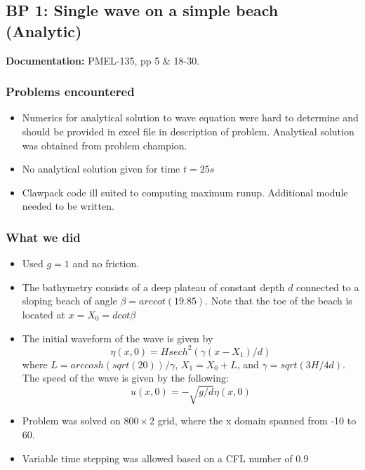 \newsection
\subsection{BP 1:
  Single wave on a simple beach (Analytic)}

{\bf Documentation:}  PMEL-135, pp 5 \&
18-30.\cite{SynolakisBernard:pmel135}

\subsubsection{Problems encountered}

\begin{itemize}
\item Numerics for analytical solution to wave equation were hard to determine and should be provided in excel file in description of problem. Analytical solution was obtained from problem champion.
\item No analytical solution given for time $t = 25s$
\item Clawpack code ill suited to computing maximum runup. Additional module needed to be written. 
\end{itemize}

\subsubsection{What we did}

\begin{itemize}
\item Used $g=1$ and no friction.
\item The bathymetry consists of a deep plateau of constant depth $d$ connected to a sloping beach of angle $\beta = arccot(19.85)$. Note that the toe of the beach is located at $x = X_0 = d cot \beta$
\item The initial waveform of the wave is given by 
\begin{equation}
\eta(x,0) = H sech^2(\gamma (x - X_1)/d)
\end{equation}
where $L = arccosh(sqrt(20))/\gamma$, $X_1 = X_0 + L$, and $\gamma = sqrt(3H/4d)$. The speed of the wave is given by the following: 
\begin{equation}
u(x,0)=-\sqrt{g/d}\eta(x,0)
\end{equation}
\item Problem was solved on $800\times 2$ grid, where the x domain spanned from -10 to 60.
\item Variable time stepping was allowed based on a CFL number of 0.9
\end{itemize} 

